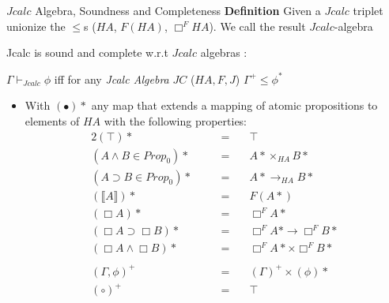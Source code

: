 \documentclass{beamer}
\begin{document}
\begin{frame}{$Jcalc$ Algebra, Soundness and Completeness}
  \textbf{Definition}
   Given a $Jcalc$ triplet unionize the $\le$s ($HA$, $F(HA)$, $\Box^{F}HA$).
   We call the result  $Jcalc$-algebra
  
  \begin{theorem}
  Jcalc is sound and complete w.r.t $Jcalc$ algebras :
  
    $\Gamma\vdash_{Jcalc}\phi$ iff for any \textit{Jcalc Algebra}  $JC$ ($HA,F,J$)
    $\Gamma^+\leq\phi^{*}$ 
  \end{theorem}
\end{frame}
\begin{frame}
  \begin{itemize}
    \item[] With $(\bullet)*$  any map that extends a mapping of atomic propositions
    to elements of $HA$ with the following properties:
  \begin{alignat*}{2}
    (\top)* &&\quad= & \quad\top\\
    (A\wedge B \in Prop_0)*  &&\quad = & \quad  A*\times_{HA}B*\\
    (A\supset B \in Prop_0)*  &&\quad = & \quad A*\rightarrow_{HA} B*\\
    (\llbracket A\rrbracket)* && \quad = & \quad F(A*)\\					
    (\Box A)* &&\quad = & \quad\Box^F A* \\
    (\Box A\supset \Box B)*  &&\quad = & \quad\Box^F A* \rightarrow{\Box^F B*}\\
    (\Box A\wedge\Box B)*  &&\quad = & \quad\Box^F A*\times{\Box^F B*}\\
    \\
    (\Gamma,\phi)^+ &&\quad = & \quad  (\Gamma)^+\times(\phi)*\\
    (\circ)^+ &&\quad = & \quad\top
  \end{alignat*}
\end{itemize}
\end{frame}
\end{document}
